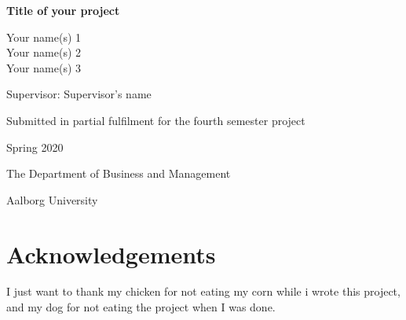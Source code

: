 \documentclass[10pt,twoside]{article}
\title{}
\author{}
\date{}
\begin{document}

\begin{centering}

\vspace{2 cm}

\Large

{\bf Title of your project}

\vspace{2 cm}

\Large
Your name(s) 1\\
Your name(s) 2\\
Your name(s) 3

\vspace{2 cm}

\normalsize
Supervisor: Supervisor's name

\vspace{2 cm}

\normalsize
Submitted in partial fulfilment for the fourth semester project

Spring 2020

\vspace{2 cm}

\normalsize
The Department of Business and Management

\normalsize
Aalborg University

\end{centering}

\newpage

\pagestyle{fancy}

\fancyhead[LE,RO]{}
\fancyhead[LO,RE]{}

\renewcommand{\headrulewidth}{0.4pt}
\renewcommand{\footrulewidth}{0pt}


\FloatBarrier
\newpage

\section*{Acknowledgements}

I just want to thank my chicken for not eating my corn while i wrote
this project, and my dog for not eating the project when I was done.

\FloatBarrier
\cleardoublepage


\setcounter{tocdepth}{2}

\tableofcontents
\end{document}
